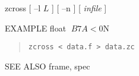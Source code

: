 
\begin{synopsis}
\item[zcross] [ --l $L$ ] [ --n ] [ {\em infile} ]
\end{synopsis}



\begin{qsection}{EXAMPLE}
float $B7A<0$N%
\begin{quote}
  \verb!zcross < data.f > data.zc!
\end{quote}
\end{qsection}

\begin{qsection}{SEE ALSO}
  frame, spec
\end{qsection}
